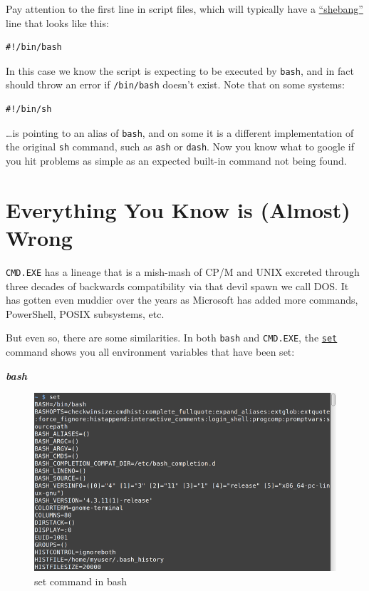 \documentclass[10pt,]{book}
\numberwithin{figure}{chapter}
\begin{document}
Pay attention to the first line in script files, which will typically
have a
\href{https://en.wikipedia.org/wiki/Shebang_\%28Unix\%29}{``shebang''}
line that looks like this:

\begin{verbatim}
#!/bin/bash
\end{verbatim}

In this case we know the script is expecting to be executed by
\texttt{bash}, and in fact should throw an error if \texttt{/bin/bash}
doesn't exist. Note that on some systems:

\begin{verbatim}
#!/bin/sh
\end{verbatim}

\ldots{}is pointing to an alias of \texttt{bash}, and on some it is a
different implementation of the original \texttt{sh} command, such as
\texttt{ash} or \texttt{dash}. Now you know what to google if you hit
problems as simple as an expected built-in command not being found.

\section{Everything You Know is (Almost)
Wrong}\label{everything-you-know-is-almost-wrong}

\texttt{CMD.EXE} has a lineage that is a mish-mash of CP/M and UNIX
excreted through three decades of backwards compatibility via that devil
spawn we call DOS. It has gotten even muddier over the years as
Microsoft has added more commands, PowerShell, POSIX subsystems, etc.

But even so, there are some similarities. In both \texttt{bash} and
\texttt{CMD.EXE}, the
\href{http://linux.die.net/man/1/set}{\texttt{set}} command shows you
all environment variables that have been set:

\textbf{\emph{bash}}

\ifxetex

\begin{figure}[!htbp]
\includegraphics{./images/set.png}%
\caption{set command in bash}%
\end{figure}
\end{document}
